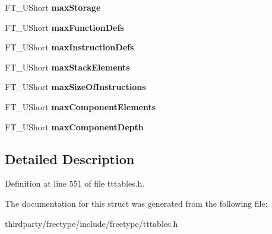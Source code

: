 \begin{DoxyCompactItemize}
\mbox{\label{struct_t_t___max_profile___a502a8579e3d358f3c00776ed0cc8a168}} 
F\+T\+\_\+\+U\+Short {\bfseries max\+Storage}
\item 
\mbox{\label{struct_t_t___max_profile___acc24e822a62bbfaa86d36f691fcde60b}} 
F\+T\+\_\+\+U\+Short {\bfseries max\+Function\+Defs}
\item 
\mbox{\label{struct_t_t___max_profile___a3f7bd433baede417293415cf60f20d8f}} 
F\+T\+\_\+\+U\+Short {\bfseries max\+Instruction\+Defs}
\item 
\mbox{\label{struct_t_t___max_profile___a2df9b9ff2a5a9daaa7c3d40fe024637f}} 
F\+T\+\_\+\+U\+Short {\bfseries max\+Stack\+Elements}
\item 
\mbox{\label{struct_t_t___max_profile___ac458411198b09d303ec8ae206e6926b6}} 
F\+T\+\_\+\+U\+Short {\bfseries max\+Size\+Of\+Instructions}
\item 
\mbox{\label{struct_t_t___max_profile___a110e6d735610c6d8fd89221d03440c32}} 
F\+T\+\_\+\+U\+Short {\bfseries max\+Component\+Elements}
\item 
\mbox{\label{struct_t_t___max_profile___a9ae1f117c954e0711b03f1675d6191d9}} 
F\+T\+\_\+\+U\+Short {\bfseries max\+Component\+Depth}
\end{DoxyCompactItemize}


\subsection{Detailed Description}


Definition at line 551 of file tttables.\+h.



The documentation for this struct was generated from the following file\+:\begin{DoxyCompactItemize}
\item 
thirdparty/freetype/include/freetype/tttables.\+h\end{DoxyCompactItemize}
